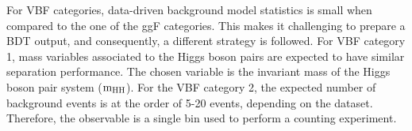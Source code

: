For VBF categories, data-driven background model statistics is small when compared to the one of the ggF categories. This makes it challenging to prepare a BDT output, and consequently, a different strategy is followed. For VBF category 1, mass variables associated to the Higgs boson pairs are expected to have similar separation performance. The chosen variable is the invariant mass of the Higgs boson pair system ($\mathrm{m_{HH}}$). For the VBF category 2, the expected number of background events is at the order of 5-20 events, depending on the dataset. Therefore, the observable is a single bin used to perform a counting experiment.